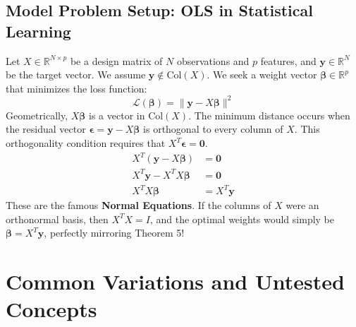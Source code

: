 \documentclass[11pt, letterpaper]{article}
\theoremstyle{definition}
\theoremstyle{remark}
\newcommand{\R}{\mathbb{R}}
\begin{document}
\subsection{Model Problem Setup: OLS in Statistical Learning}
Let $X \in \R^{N \times p}$ be a design matrix of $N$ observations and $p$ features, and $\mathbf{y} \in \R^N$ be the target vector. We assume $\mathbf{y} \notin \text{Col}(X)$. We seek a weight vector $\boldsymbol{\beta} \in \R^p$ that minimizes the loss function:
\[ \mathcal{L}(\boldsymbol{\beta}) = \|\mathbf{y} - X\boldsymbol{\beta}\|^2 \]
Geometrically, $X\boldsymbol{\beta}$ is a vector in $\text{Col}(X)$. The minimum distance occurs when the residual vector $\boldsymbol{\epsilon} = \mathbf{y} - X\boldsymbol{\beta}$ is orthogonal to every column of $X$. 
This orthogonality condition requires that $X^T \boldsymbol{\epsilon} = \mathbf{0}$.
\begin{align*}
    X^T (\mathbf{y} - X\boldsymbol{\beta}) &= \mathbf{0} \\
    X^T \mathbf{y} - X^T X \boldsymbol{\beta} &= \mathbf{0} \\
    X^T X \boldsymbol{\beta} &= X^T \mathbf{y}
\end{align*}
These are the famous \textbf{Normal Equations}. If the columns of $X$ were an orthonormal basis, then $X^T X = I$, and the optimal weights would simply be $\boldsymbol{\beta} = X^T \mathbf{y}$, perfectly mirroring Theorem 5!

\newpage
\section{Common Variations and Untested Concepts}
\end{document}
